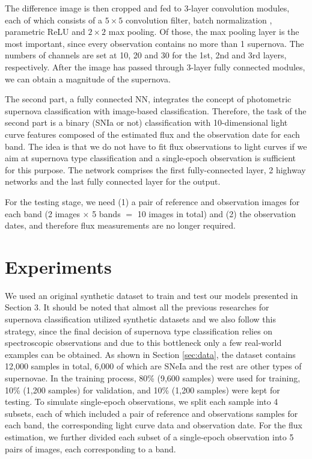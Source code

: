 \documentclass[conference,compsoc]{IEEEtran}
\begin{document}
  The difference image is then cropped and fed to 3-layer convolution modules, each of which consists of a $5\times 5$ convolution filter, batch normalization \cite{batchNormalization}, parametric ReLU and $2\times 2$ max pooling.
  Of those, the max pooling layer is the most important, since every observation contains no more than 1 supernova.
  The numbers of channels are set at 10, 20 and 30 for the 1st, 2nd and 3rd layers, respectively.
  After the image has passed through 3-layer fully connected modules, we can obtain a magnitude of the supernova.

  The second part, a fully connected NN, integrates the concept of photometric supernova classification with image-based classification.
  Therefore, the task of the second part is a binary (SNIa or not) classification with 10-dimensional light curve features composed of the estimated flux and the observation date for each band.
  The idea is that we do not have to fit flux observations to light curves if we aim at supernova type classification and a single-epoch observation is sufficient for this purpose.
  The network comprises the first fully-connected layer, 2 highway networks \cite{Srivastava2015} and the last fully connected layer for the output.

  For the testing stage, we need (1) a pair of reference and observation images for each band (2 images $\times$ 5 bands $=$ 10 images in total) and (2) the observation dates, and therefore flux measurements are no longer required.


\section{Experiments}
\label{sec:exp}

  We used an original synthetic dataset to train and test our models presented in Section 3. %
  It should be noted that almost all the previous researches for supernova classification utilized synthetic datasets and we also follow this strategy, since the final decision of supernova type classification relies on spectroscopic observations and due to this bottleneck only a few real-world examples can be obtained.
  As shown in Section \ref{sec:data}, the dataset contains 12,000 samples in total, 6,000 of which are SNeIa and the rest are other types of supernovae.
  In the training process, 80\% (9,600 samples) were used for training, 10\% (1,200 samples) for validation, and 10\% (1,200 samples) were kept for testing.
  To simulate single-epoch observations, we split each sample into 4 subsets, each of which included a pair of reference and observations samples for each band, the corresponding light curve data and observation date.
  For the flux estimation, we further divided each subset of a single-epoch observation into 5 pairs of images, each corresponding to a band.
\end{document}

